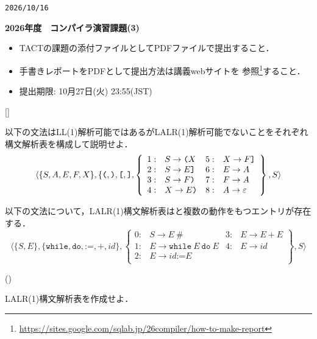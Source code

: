 \documentclass[dvipdfmx]{jarticle}
\newcounter{coffee}
\newcounter{bean}
\begin{document}
\begin{flushright}
  \texttt{2026/10/16}
\end{flushright}
\begin{center}{\bf\Large
    2026年度　コンパイラ演習課題(3)
  }\end{center}
\begin{itemize}
  \item TACTの課題の添付ファイルとしてPDFファイルで提出すること．
  \item 手書きレポートをPDFとして提出方法は講義webサイトを
        参照\footnote{\url{https://sites.google.com/sqlab.jp/26compiler/how-to-make-report}}すること．
  \item 提出期限: 10月27日(火) 23:55(JST)
\end{itemize}
\begin{list}{[]}{}
    \item 以下の文法はLL(1)解析可能ではあるがLALR(1)解析可能でないことをそれぞれ構文解析表を構成して説明せよ．
        \[\langle\{S,A,E,F,X\},\{\texttt{(},\texttt{)},\texttt{[},\texttt{]},\left\{
            \begin{array}{clcl}
                1: & S\rightarrow \verb|(|X & 5: & X\rightarrow F\verb|]| \\
                2: & S\rightarrow E\verb|]| & 6: & E \rightarrow A        \\
                3: & S\rightarrow F\verb|)| & 7: & F\rightarrow A         \\
                4: & X\rightarrow E\verb|)| & 8: & A\rightarrow\varepsilon
            \end{array}
        \right\},S\rangle\]
    \item 以下の文法について，LALR(1)構文解析表はと複数の動作をもつエントリが存在する．
            \[\langle\{S,E\},\{\texttt{while},\texttt{do},\texttt{:=},\texttt{+},id\},
            \left\{\begin{array}{clcl}
                0: & S\rightarrow E\ \# & 3: & E\rightarrow E\ \texttt{+}\ E\\
                1: & E\rightarrow \texttt{while}\ E\ \texttt{do}\ E & 4: & E\rightarrow id\\
                2: & E\rightarrow id\texttt{:=}E & & \\
            \end{array}\right\},S\rangle\]
        \begin{list}{()}{}
            \item LALR(1)構文解析表を作成せよ．

\end{list}
\end{list}
\end{document}
